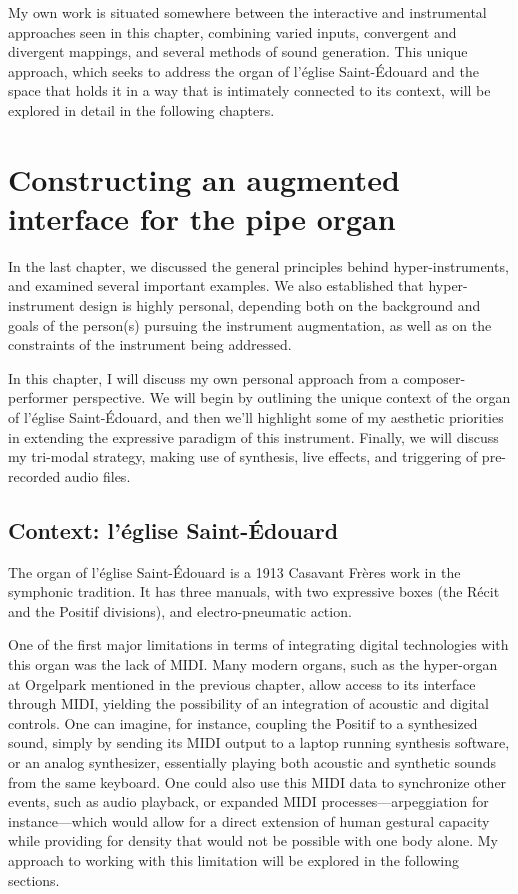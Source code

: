 \documentclass[12pt,twoside,maitrise]{dms_ks}
\theoremstyle{definition}
\begin{document}
{My own work is situated somewhere between the interactive and instrumental approaches seen in this chapter, combining varied inputs, convergent and divergent mappings, and several methods of sound generation.
This unique approach, which seeks to address the organ of l'église Saint-Édouard and the space that holds it in a way that is intimately connected to its context, will be explored in detail in the following chapters. 

\chapter{Constructing an augmented interface for the pipe organ}

In the last chapter, we discussed the general principles behind hyper-instruments, and examined several important examples. 
We also established that hyper-instrument design is highly personal, depending both on the background and goals of the person(s) pursuing the instrument augmentation, as well as on the constraints of the instrument being addressed. 

In this chapter, I will discuss my own personal approach from a composer-performer perspective. We will begin by outlining the unique context of the organ of l'église Saint-Édouard, and then we'll highlight some of my aesthetic priorities in extending the expressive paradigm of this instrument. Finally, we will discuss my tri-modal strategy, making use of synthesis, live effects, and triggering of pre-recorded audio files. 

\section{Context: l'église Saint-Édouard}

The organ of l'église Saint-Édouard is a 1913 Casavant Frères work in the symphonic tradition. 
It has three manuals, with two expressive boxes (the Récit and the Positif divisions), and electro-pneumatic action. 

One of the first major limitations in terms of integrating digital technologies with this organ was the lack of MIDI. 
Many modern organs, such as the hyper-organ at Orgelpark mentioned in the previous chapter, allow access to its interface through MIDI, yielding the possibility of an integration of acoustic and digital controls. 
One can imagine, for instance, coupling the Positif to a synthesized sound, simply by sending its MIDI output to a laptop running synthesis software, or an analog synthesizer, essentially playing both acoustic and synthetic sounds from the same keyboard. 
One could also use this MIDI data to synchronize other events, such as audio playback, or expanded MIDI processes---arpeggiation for instance---which would allow for a direct extension of human gestural capacity while providing for density that would not be possible with one body alone.
My approach to working with this limitation will be explored in the following sections.

}
\end{document}
